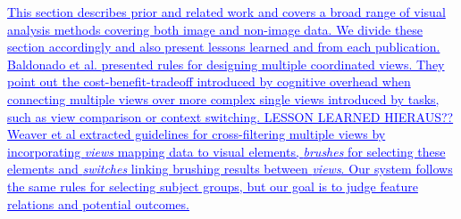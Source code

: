 \documentclass[journal]{style/vgtc} 			          %
\newcommand{\add}[1]{\textcolor{blue}{\uline{#1}}}
\begin{document}
\add{%
%
This section describes prior and related work and covers a broad range of visual analysis methods covering both image and non-image data.
%
We divide these section accordingly and also present lessons learned and from each publication.\\
Baldonado et al. \cite{Baldonado2000} presented rules for designing multiple coordinated views.
%
They point out the cost-benefit-tradeoff introduced by cognitive overhead when connecting multiple views over more complex single views introduced by tasks, such as view comparison or context switching.
%
LESSON LEARNED HIERAUS??
%
Weaver et al extracted guidelines for cross-filtering multiple views by incorporating \emph{views} mapping data to visual elements, \emph{brushes} for selecting these elements and \emph{switches} linking brushing results between \emph{views}.
%
Our system follows the same rules for selecting subject groups, but our goal is to judge feature relations and potential outcomes.
}
\end{document}
